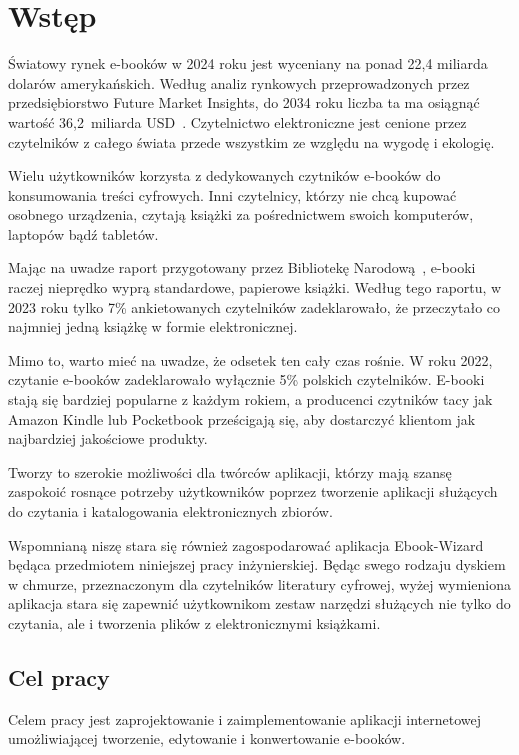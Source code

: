 \chapter{Wstęp}
\label{sec:chapter1}

Światowy rynek e-booków w 2024 roku jest wyceniany na ponad 22,4 miliarda dolarów amerykańskich. Według analiz rynkowych przeprowadzonych przez przedsiębiorstwo Future Market Insights, do 2034 roku liczba ta ma osiągnąć wartość 36,2~miliarda USD~\cite{raport_rynku_ebookow_2024}. Czytelnictwo elektroniczne jest cenione przez czytelników z całego świata przede wszystkim ze względu na wygodę i ekologię. 

Wielu użytkowników korzysta z dedykowanych czytników e-booków do konsumowania treści cyfrowych. Inni czytelnicy, którzy nie chcą kupować osobnego urządzenia, czytają książki za pośrednictwem swoich komputerów, laptopów bądź tabletów.

Mając na uwadze raport przygotowany przez Bibliotekę Narodową~\cite{raport_czytelnictwa_2023}, e-booki raczej nieprędko wyprą standardowe, papierowe książki. Według tego raportu, w 2023 roku tylko 7\% ankietowanych czytelników zadeklarowało, że przeczytało co najmniej jedną książkę w formie elektronicznej.

Mimo to, warto mieć na uwadze, że odsetek ten cały czas rośnie. W roku 2022, czytanie e-booków zadeklarowało wyłącznie 5\% polskich czytelników. E-booki stają się bardziej popularne z każdym rokiem, a producenci czytników tacy jak Amazon Kindle lub Pocketbook prześcigają się, aby dostarczyć klientom jak najbardziej jakościowe produkty. 

Tworzy to szerokie możliwości dla twórców aplikacji, którzy mają szansę zaspokoić rosnące potrzeby użytkowników poprzez tworzenie aplikacji służących do czytania i katalogowania elektronicznych zbiorów.

Wspomnianą niszę stara się również zagospodarować aplikacja Ebook-Wizard będąca przedmiotem niniejszej pracy inżynierskiej. Będąc swego rodzaju dyskiem w chmurze, przeznaczonym dla czytelników literatury cyfrowej, wyżej wymieniona aplikacja stara się zapewnić użytkownikom zestaw narzędzi służących nie tylko do czytania, ale i tworzenia plików z elektronicznymi książkami.

\section{Cel pracy}
\label{sec:1:chapter1}
Celem pracy jest zaprojektowanie i zaimplementowanie aplikacji internetowej umożliwiającej tworzenie, edytowanie i konwertowanie e-booków.


